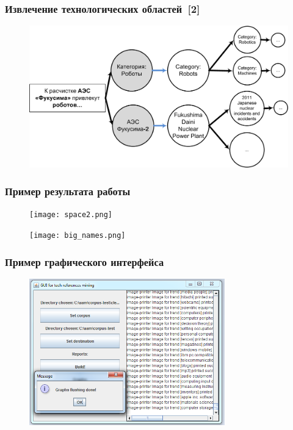\documentclass{beamer}
\begin{document}
\begin{frame}\frametitle{Извлечение технологических областей~[2]}

\begin{figure}[ht]
\begin{center}
\includegraphics[width=4.5in]{Process.png}
\end{center}
\end{figure}

\end{frame}

\begin{frame}\frametitle{Пример результата работы}
\begin{figure}[ht]
\begin{center}
\texttt{[image: space2.png]}
\end{center}
\end{figure}
\begin{figure}[ht]
\begin{center}
\texttt{[image: big\_names.png]}
\end{center}
\end{figure}
\end{frame}


\begin{frame}\frametitle{Пример графического интерфейса}
\begin{figure}[ht]
\begin{center}
\includegraphics[height=2.5in]{gui.png}
\end{center}
\end{figure}
\end{frame}
\end{document}

